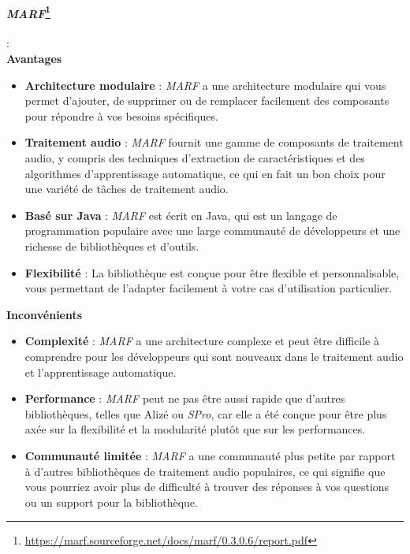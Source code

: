 \paragraph*{\textbf{\textit{MARF}}\footnote{\url{https://marf.sourceforge.net/docs/marf/0.3.0.6/report.pdf}}}:\\


\textbf{Avantages}
\begin{itemize}
    \item \textbf{Architecture modulaire} : \textit{MARF} a une architecture modulaire qui vous permet d'ajouter, de supprimer ou de remplacer facilement des composants
          pour répondre à vos besoins spécifiques.
    \item \textbf{Traitement audio} : \textit{MARF} fournit une gamme de composants de traitement audio, y compris des techniques d'extraction de caractéristiques et des
          algorithmes d'apprentissage automatique, ce qui en fait un bon choix pour une variété de tâches de traitement audio.
    \item \textbf{Basé sur Java} : \textit{MARF} est écrit en Java, qui est un langage de programmation populaire avec une large communauté de développeurs et une richesse
          de bibliothèques et d'outils.
    \item \textbf{Flexibilité} : La bibliothèque est conçue pour être flexible et personnalisable, vous permettant de l'adapter facilement à votre cas d'utilisation particulier.
\end{itemize}


\textbf{Inconvénients}
\begin{itemize}
    \item \textbf{Complexité} : \textit{MARF} a une architecture complexe et peut être difficile à comprendre pour les développeurs qui sont nouveaux dans le traitement audio
          et l'apprentissage automatique.
    \item \textbf{Performance} : \textit{MARF} peut ne pas être aussi rapide que d'autres bibliothèques, telles que Alizé ou \textit{SPro}, car elle a été conçue pour être
          plus axée sur la flexibilité et la modularité plutôt que sur les performances.
    \item \textbf{Communauté limitée} : \textit{MARF} a une communauté plus petite par rapport à d'autres bibliothèques de traitement audio populaires, ce qui signifie que
          vous pourriez avoir plus de difficulté à trouver des réponses à vos questions ou un support pour la bibliothèque.
\end{itemize}
